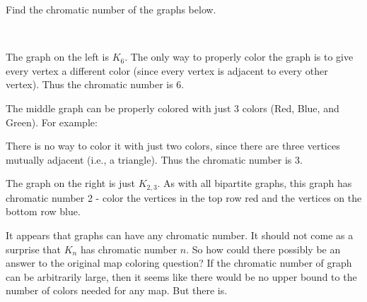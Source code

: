 \documentclass[12pt]{article}
\begin{document}
\begin{example}
  Find the chromatic number of the graphs below.
  \begin{center}
    \hfill
    \hfill
    \hfill
  \hfill ~
  \end{center}

\begin{solution}
  The graph on the left is $K_6$.  The only way to properly color the graph is to give every vertex a different color (since every vertex is adjacent to every other vertex).  Thus the chromatic number is 6.
  
  The middle graph can be properly colored with just 3 colors (Red, Blue, and Green).  For example:
  
  \begin{center}
  \end{center}
  
  There is no way to color it with just two colors, since there are three vertices mutually adjacent (i.e., a triangle).  Thus the chromatic number is 3.
  
  The graph on the right is just $K_{2,3}$.  As with all bipartite graphs, this graph has chromatic number 2 - color the vertices in the top row red and the vertices on the bottom row blue.
\end{solution}

\end{example}

It appears that graphs can have any chromatic number.  It should not come as a surprise that $K_n$ has chromatic number $n$.  So how could there possibly be an answer to the original map coloring question?  If the chromatic number of graph can be arbitrarily large, then it seems like there would be no upper bound to the number of colors needed for any map.  But there is.
\end{document}
